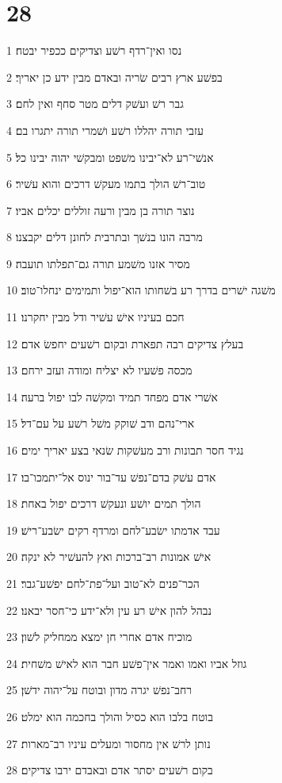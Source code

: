\chapter{28}

\par 1 נסו ואין־רדף רשׁע וצדיקים ככפיר יבטח׃
\par 2 בפשׁע ארץ רבים שׂריה ובאדם מבין ידע כן יאריך׃
\par 3 גבר רשׁ ועשׁק דלים מטר סחף ואין לחם׃
\par 4 עזבי תורה יהללו רשׁע ושׁמרי תורה יתגרו בם׃
\par 5 אנשׁי־רע לא־יבינו משׁפט ומבקשׁי יהוה יבינו כל׃
\par 6 טוב־רשׁ הולך בתמו מעקשׁ דרכים והוא עשׁיר׃
\par 7 נוצר תורה בן מבין ורעה זוללים יכלים אביו׃
\par 8 מרבה הונו בנשׁך ובתרבית לחונן דלים יקבצנו׃
\par 9 מסיר אזנו משׁמע תורה גם־תפלתו תועבה׃
\par 10 משׁגה ישׁרים בדרך רע בשׁחותו הוא־יפול ותמימים ינחלו־טוב׃
\par 11 חכם בעיניו אישׁ עשׁיר ודל מבין יחקרנו׃
\par 12 בעלץ צדיקים רבה תפארת ובקום רשׁעים יחפשׂ אדם׃
\par 13 מכסה פשׁעיו לא יצליח ומודה ועזב ירחם׃
\par 14 אשׁרי אדם מפחד תמיד ומקשׁה לבו יפול ברעה׃
\par 15 ארי־נהם ודב שׁוקק משׁל רשׁע על עם־דל׃
\par 16 נגיד חסר תבונות ורב מעשׁקות שׂנאי בצע יאריך ימים׃
\par 17 אדם עשׁק בדם־נפשׁ עד־בור ינוס אל־יתמכו־בו׃
\par 18 הולך תמים יושׁע ונעקשׁ דרכים יפול באחת׃
\par 19 עבד אדמתו ישׂבע־לחם ומרדף רקים ישׂבע־רישׁ׃
\par 20 אישׁ אמונות רב־ברכות ואץ להעשׁיר לא ינקה׃
\par 21 הכר־פנים לא־טוב ועל־פת־לחם יפשׁע־גבר׃
\par 22 נבהל להון אישׁ רע עין ולא־ידע כי־חסר יבאנו׃
\par 23 מוכיח אדם אחרי חן ימצא ממחליק לשׁון׃
\par 24 גוזל אביו ואמו ואמר אין־פשׁע חבר הוא לאישׁ משׁחית׃
\par 25 רחב־נפשׁ יגרה מדון ובוטח על־יהוה ידשׁן׃
\par 26 בוטח בלבו הוא כסיל והולך בחכמה הוא ימלט׃
\par 27 נותן לרשׁ אין מחסור ומעלים עיניו רב־מארות׃
\par 28 בקום רשׁעים יסתר אדם ובאבדם ירבו צדיקים׃

